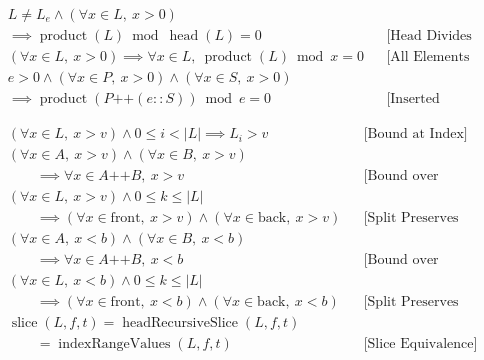 \begin{equation*}
\begin{aligned}
&L \neq L_e \land (\forall x \in L,\ x > 0) \\
&\implies \operatorname{product}(L) \bmod \operatorname{head}(L) = 0
  &&\text{[Head Divides Product]} \\
&(\forall x \in L,\ x > 0)
  \implies \forall x \in L,\ \operatorname{product}(L) \bmod x = 0
  &&\text{[All Elements Divide Product]} \\
&e > 0 \land (\forall x \in P,\ x > 0) \land (\forall x \in S,\ x > 0) \\
&\implies \operatorname{product}(P \mathbin{\texttt{++}} (e :: S)) \bmod e = 0
  &&\text{[Inserted Element Divides Product]}
\end{aligned}
\end{equation*}

\begin{equation*}
\begin{aligned}
&(\forall x \in L,\ x > v) \land 0 \leq i < |L|
  \implies L_i > v
  &&\text{[Bound at Index]} \\
&(\forall x \in A,\ x > v) \land (\forall x \in B,\ x > v) \\
&\qquad \implies \forall x \in A \mathbin{\texttt{++}} B,\ x > v
  &&\text{[Bound over Concatenation]} \\
&(\forall x \in L,\ x > v) \land 0 \leq k \leq |L| \\
&\qquad \implies (\forall x \in \text{front},\ x > v)
     \land (\forall x \in \text{back},\ x > v)
  &&\text{[Split Preserves Lower Bound]} \\
&(\forall x \in A,\ x < b) \land (\forall x \in B,\ x < b) \\
&\qquad \implies \forall x \in A \mathbin{\texttt{++}} B,\ x < b
  &&\text{[Bound over Concatenation, Upper]} \\
&(\forall x \in L,\ x < b) \land 0 \leq k \leq |L| \\
&\qquad \implies (\forall x \in \text{front},\ x < b)
     \land (\forall x \in \text{back},\ x < b)
  &&\text{[Split Preserves Upper Bound]} \\
&\operatorname{slice}(L,f,t)
  = \operatorname{headRecursiveSlice}(L,f,t) \\
&\qquad = \operatorname{indexRangeValues}(L,f,t)
  &&\text{[Slice Equivalence]}
\end{aligned}
\end{equation*}

